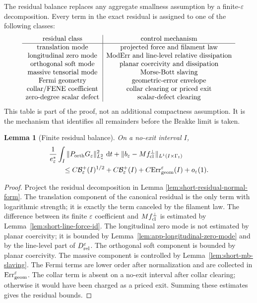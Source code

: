 \documentclass[11pt]{article}
\newtheorem{lemma}[theorem]{Lemma}
\theoremstyle{definition}
\newcommand{\dd}{\,\mathrm d}
\newcommand{\eps}{\varepsilon}
\newcommand{\estar}{e_\varepsilon^\ast}
\newcommand{\Basin}{\mathcal B}
\begin{document}
The residual balance replaces any aggregate smallness assumption by a
finite-\(\eps\) decomposition.  Every term in the exact residual is assigned to
one of the following classes:
\[
\begin{array}{c|c}
\hbox{residual class} & \hbox{control mechanism}\\ \hline
\hbox{translation mode} & \hbox{projected force and filament law}\\
\hbox{longitudinal zero mode} & \hbox{ModErr and line-level relative dissipation}\\
\hbox{orthogonal soft mode} & \hbox{planar coercivity and dissipation}\\
\hbox{massive tensorial mode} & \hbox{Morse-Bott slaving}\\
\hbox{Fermi geometry} & \hbox{geometric-error envelope}\\
\hbox{collar/FENE coefficient} & \hbox{collar clearing or priced exit}\\
\hbox{zero-degree scalar defect} & \hbox{scalar-defect clearing}
\end{array}
\]
This table is part of the proof, not an additional compactness assumption.  It
is the mechanism that identifies all remainders before the Brakke limit is
taken.

\begin{lemma}[Finite residual balance]
\label{lem:app-finite-ledger}
On a no-exit interval \(I\),
\[
\begin{aligned}
&\frac1{\estar}
        \int_I\|P_{\rm orth}G_\eps\|_{L_\ast^2}^2\,\dd t
        +
        \|b_\eps-Mf_{\rm cl}^\perp\|_{L^1(I\times\Gamma_t)}
\\
&\qquad\le
        C\Basin_\eps^+(I)^{1/2}
        +
        C\Basin_\eps^+(I)
        +
        C{\rm Err}_{\rm geom}^\eps(I)
        +
        o_\eps(1).
\end{aligned}
\]
\end{lemma}

\begin{proof}
Project the residual decomposition in Lemma
\ref{lem:short-residual-normal-form}.  The translation component of the
canonical residual is the only term with logarithmic strength; it is exactly
the term canceled by the filament law.  The difference between its finite
\(\eps\) coefficient and \(M f_{\rm cl}^\perp\) is estimated by
Lemma~\ref{lem:short-line-force-id}.  The longitudinal zero mode is not
estimated by planar coercivity; it is bounded by
Lemma~\ref{lem:app-longitudinal-zero-mode} and by the line-level part of
\(D_{\rm rel}^\eps\).  The orthogonal soft component is bounded by planar
coercivity.  The massive component is controlled by
Lemma~\ref{lem:short-mb-slaving}.  The Fermi terms are lower order after
normalization and are collected in \({\rm Err}_{\rm geom}^\eps\).  The collar
term is absent on a no-exit interval after collar clearing; otherwise it would
have been charged as a priced exit.  Summing these estimates gives the residual bounds.
\end{proof}
\end{document}
